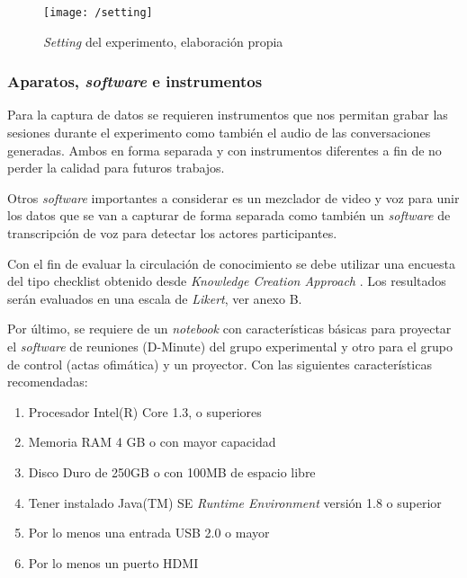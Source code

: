 \begin{figure}[h]
\centering
\texttt{[image: /setting]}
\caption{\textit{Setting} del experimento,  elaboración propia} 
\label{img5-1}
\end{figure}

\subsubsection{Aparatos, \textit{software} e instrumentos}

Para la captura de datos se requieren instrumentos que nos permitan grabar las sesiones durante el experimento como también el audio de las conversaciones generadas. Ambos en forma separada y con instrumentos diferentes a fin de no perder la calidad para futuros trabajos. 

Otros \textit{software} importantes a considerar es un mezclador de video y voz para unir los datos que se van a capturar de forma separada como también un \textit{software} de transcripción de voz para detectar los actores participantes.

Con el fin de evaluar la circulación de conocimiento se debe utilizar una encuesta del tipo checklist obtenido desde \textit{Knowledge Creation Approach} . Los resultados serán evaluados en una escala de \textit{Likert}, ver anexo B.

Por último, se requiere de un \textit{notebook} con características básicas para proyectar el \textit{software} de reuniones (D-Minute) del grupo experimental y otro para el grupo de control (actas ofimática) y un proyector. Con las siguientes características recomendadas:

\begin{enumerate}[1.]
	\item Procesador Intel(R) Core 1.3, o superiores
	\item Memoria RAM 4 GB o con mayor capacidad
	\item Disco Duro de 250GB o con 100MB de espacio libre
	\item Tener instalado Java(TM) SE \textit{Runtime Environment} versión 1.8 o superior
	\item Por lo menos una entrada USB 2.0 o mayor
	\item Por lo menos un puerto HDMI

\end{enumerate}

